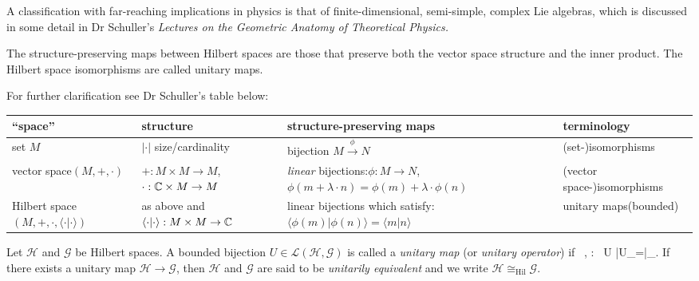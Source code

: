A classification with far-reaching implications in physics is that of finite-dimensional, semi-simple, complex Lie algebras, which is discussed in some detail in Dr Schuller's \textit{Lectures on the Geometric Anatomy of Theoretical Physics.}


The structure-preserving maps between Hilbert spaces are those that preserve both the vector space structure and the inner product. The Hilbert space isomorphisms are called unitary maps.

For further clarification see Dr Schuller's table below:

\begin{center}
	\begin{tabular}{@{} p{3cm}p{4cm}p{5cm}p{3cm}@{}}
		\toprule
		``space'' & structure & structure-preserving maps & terminology\\
		\midrule 
		set \(M\) & \(\vert \cdot \vert\) size/cardinality & bijection \(M\stackrel{\phi}{\longrightarrow} N\) & (set-)\newline isomorphisms\\
		vector space\newline \((M, +, \cdot)\) & \(+:M\times M \to M\), \newline\(\cdot: \mathbb{C}\times M \to M\) & \emph{linear} bijections:\newline \(\phi: M\to N\),\newline \(\phi(m+\lambda\cdot n) = \phi(m) + \lambda\cdot \phi (n)\) & (vector space-)\newline  isomorphisms\\
		Hilbert space \newline \((M, +, \cdot, \langle\cdot \vert\cdot\rangle)\) & as above and\newline \(\langle\cdot \vert\cdot\rangle : M\times M\to \mathbb{C}\) & linear bijections which satisfy:\newline \(\langle \phi(m)\vert \phi(n)\rangle = \langle m\vert n\rangle\) & unitary maps\newline (bounded)\\
		\bottomrule
	\end{tabular}
\end{center}


\bd
Let $\mathcal{H}$ and $\mathcal{G}$ be Hilbert spaces. A bounded bijection $U\in\mathcal{L}(\mathcal{H},\mathcal{G})$ is called a \emph{unitary map} (or \emph{unitary operator}) if
\bse
\forall \, \psi,\varphi\in{} : \
\langle U \psi|U\varphi \rangle_{}=\langle \psi|\varphi \rangle_{}.
\ese
If there exists a unitary map $\mathcal{H}\to\mathcal{G}$, then $\mathcal{H}$ and $\mathcal{G}$ are said to be \emph{unitarily equivalent} and we write $\mathcal{H}\cong_{\mathrm{Hil}}\mathcal{G}$.
\ed

